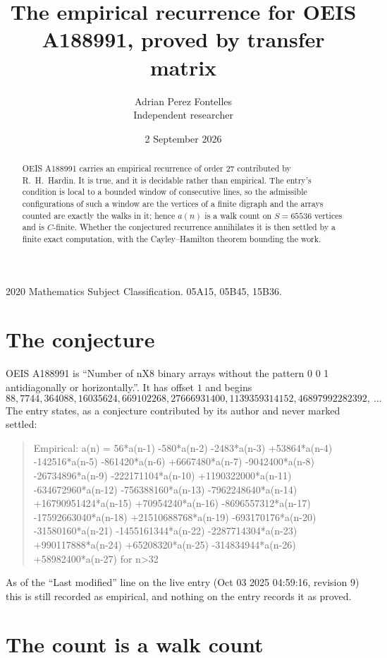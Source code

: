 \documentclass[11pt,a4paper]{article}
\title{The empirical recurrence for OEIS A188991, proved by transfer matrix}
\author{Adrian Perez Fontelles\\ \small Independent researcher}
\date{2 September 2026}
\theoremstyle{plain}
\theoremstyle{definition}
\begin{document}
\maketitle

\begin{abstract}
OEIS A188991 carries an empirical recurrence of order $27$ contributed by R.~H.~Hardin. It is
true, and it is decidable rather than empirical. The entry's condition is local to a bounded window of consecutive lines, so
the admissible configurations of such a window are the vertices of a finite digraph and the
arrays counted are exactly the walks in it; hence $a(n)$ is a walk count on $S=65536$ vertices
and is $C$-finite. Whether the conjectured recurrence annihilates it is then settled by a
finite exact computation, with the Cayley--Hamilton theorem bounding the work.
\end{abstract}

\noindent\small 2020 Mathematics Subject Classification. 05A15, 05B45, 15B36.\normalsize

\section{The conjecture}

OEIS A188991 is ``Number of nX8 binary arrays without the pattern 0 0 1 antidiagonally or horizontally.''. It has offset $1$ and begins
\[
88, 7744, 364088, 16035624, 669102268, 27666931400, 1139359314152, 46897992282392,\ \dots
\]
The entry states, as a conjecture contributed by its author and never marked settled:
\begin{quote}
Empirical: a(n) = 56*a(n-1) -580*a(n-2) -2483*a(n-3) +53864*a(n-4) -142516*a(n-5) -861420*a(n-6) +6667480*a(n-7) -9042400*a(n-8) -26734896*a(n-9) -222171104*a(n-10) +1190322000*a(n-11) -634672960*a(n-12) -756388160*a(n-13) -7962248640*a(n-14) +16790951424*a(n-15) +70954240*a(n-16) -8696557312*a(n-17) -17592663040*a(n-18) +21510688768*a(n-19) -693170176*a(n-20) -31580160*a(n-21) -1455161344*a(n-22) -2287714304*a(n-23) +990117888*a(n-24) +65208320*a(n-25) -314834944*a(n-26) +58982400*a(n-27) for n>32
\end{quote}
As of the ``Last modified'' line on the live entry (Oct 03 2025 04:59:16, revision 9) this is still
recorded as empirical, and nothing on the entry records it as proved.

\section{The count is a walk count}
\end{document}
